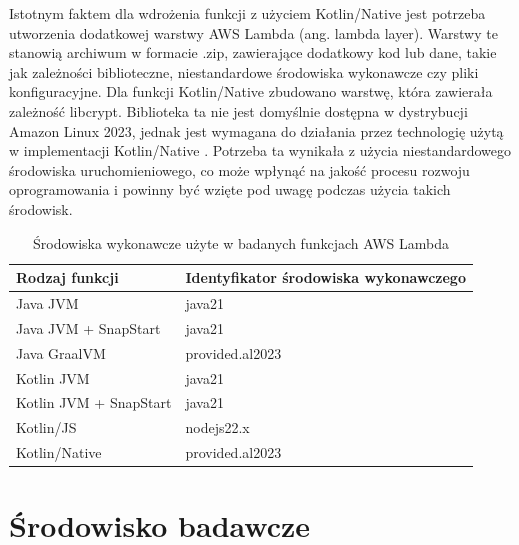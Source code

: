 Istotnym faktem dla wdrożenia funkcji z użyciem Kotlin/Native jest potrzeba utworzenia dodatkowej warstwy AWS Lambda (ang. lambda layer).
Warstwy te stanowią archiwum w formacie .zip, zawierające dodatkowy kod lub dane, takie jak zależności biblioteczne, niestandardowe środowiska wykonawcze czy pliki konfiguracyjne.
Dla funkcji Kotlin/Native zbudowano warstwę, która zawierała zależność libcrypt.
Biblioteka ta nie jest domyślnie dostępna w dystrybucji Amazon Linux 2023, jednak jest wymagana do działania przez technologię użytą w implementacji Kotlin/Native \cite{kotlinNativeLambdaRuntime}.
Potrzeba ta wynikała z użycia niestandardowego środowiska uruchomieniowego, co może wpłynąć na jakość procesu rozwoju oprogramowania i powinny być wzięte pod uwagę podczas użycia takich środowisk.

\begin{table}[h!]
    \caption{Środowiska wykonawcze użyte w badanych funkcjach AWS Lambda}
    \centering
    \begin{tabular}{|l|l|}
    \hline
    \textbf{Rodzaj funkcji}           & \textbf{Identyfikator środowiska wykonawczego}                               \\ \hline
    Java JVM                          & java21                                                      \\ \hline
    Java JVM + SnapStart              & java21                                                      \\ \hline
    Java GraalVM                      & provided.al2023                                              \\ \hline
    Kotlin JVM                        & java21                                                      \\ \hline
    Kotlin JVM + SnapStart            & java21                                                      \\ \hline
    Kotlin/JS                         & nodejs22.x                                                   \\ \hline
    Kotlin/Native                     & provided.al2023                                              \\ \hline
    \end{tabular}
    \label{table:lambda_runtimes}
\end{table}

\section{Środowisko badawcze}\label{chapter:srodowisko_badawcze}

